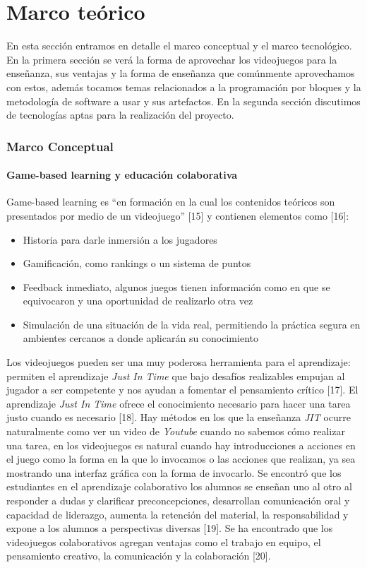 \chapter{Marco teórico}
En esta sección entramos en detalle el marco conceptual y el marco tecnológico. En la primera sección se verá la forma de aprovechar los videojuegos para la enseñanza, sus ventajas y la forma de enseñanza que comúnmente aprovechamos con estos, además tocamos temas relacionados a la programación por bloques y la metodología de software a usar y sus artefactos. En la segunda sección discutimos de tecnologías aptas para la realización del proyecto.

\subsection{Marco Conceptual}
\subsubsection{Game-based learning y educación colaborativa}
Game-based learning es “en formación en la cual los contenidos teóricos son presentados por medio de un videojuego” [15] y contienen elementos como [16]:
\begin{itemize}
    \item Historia para darle inmersión a los jugadores
    \item Gamificación, como rankings o un sistema de puntos
    \item Feedback inmediato, algunos juegos tienen información como en que se equivocaron y una oportunidad de realizarlo otra vez
    \item Simulación de una situación de la vida real, permitiendo la práctica segura en ambientes cercanos a donde aplicarán su conocimiento
\end{itemize}

Los videojuegos pueden ser una muy poderosa herramienta para el aprendizaje: permiten el aprendizaje \textit{Just In Time} que bajo desafíos realizables empujan al 
jugador a ser competente y nos ayudan a fomentar el pensamiento crítico [17]. 
El aprendizaje \textit{Just In Time} ofrece el conocimiento necesario para hacer una tarea justo cuando es necesario [18]. 
Hay métodos en los que la enseñanza \textit{JIT} ocurre naturalmente como ver un video de \textit{Youtube} cuando no sabemos cómo realizar una tarea, 
en los videojuegos es natural cuando hay introducciones a acciones en el juego como la forma en la que lo invocamos o las acciones que realizan, 
ya sea mostrando una interfaz gráfica con la forma de invocarlo.
Se encontró que los estudiantes en el aprendizaje colaborativo los alumnos se enseñan uno al otro al responder a dudas y 
clarificar preconcepciones, desarrollan comunicación oral y capacidad de liderazgo, aumenta la retención del material, 
la responsabilidad y expone a los alumnos a perspectivas diversas [19].
Se ha encontrado que los videojuegos colaborativos agregan ventajas como el trabajo en equipo, el pensamiento creativo, 
la comunicación y la colaboración [20].

